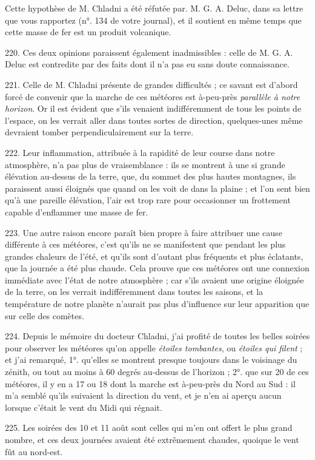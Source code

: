 \documentclass[a4paper, 11pt, oneside, polutonikogreek, french]{article}
\begin{document}
Cette hypothèse de M. Chladni a été réfutée par. M. G. A. Deluc, dans sa lettre que vous rapportez (n°. 134 de votre journal), et il soutient en même temps que cette masse de fer est un produit volcanique.

220. Ces deux opinions paraissent également inadmissibles : celle de M. G. A. Deluc est contredite par des faits dont il n'a pas eu sans doute connaissance.

221. Celle de M. Chladni présente de grandes difficultés ; ce savant est d'abord forcé de convenir que la marche de ces météores est à-peu-près \emph{parallèle à notre horizon}. Or il est évident que s'ils venaient indifféremment de tous les points de l'espace, on les verrait aller dans toutes sortes de direction, quelques-unes même devraient tomber perpendiculairement sur la terre.

222. Leur inflammation, attribuée à la rapidité de leur course dans notre atmosphère, n'a pas plus de vraisemblance : ils se montrent à une si grande élévation au-dessus de la terre, que, du sommet des plus hautes montagnes, ils paraissent aussi éloignés que quand on les voit de dans la plaine ; et l'on sent bien qu'à une pareille élévation, l'air est trop rare pour occasionner un frottement capable d'enflammer une masse de fer.

223. Une autre raison encore paraît bien propre à faire attribuer une cause différente à ces météores, c'est qu'ils ne se manifestent que pendant les plus grandes chaleurs de l'été, et qu'ils sont d'autant plus fréquents et plus éclatants, que la journée a été plus chaude. Cela prouve que ces météores ont une connexion immédiate avec l'état de notre atmosphère ; car s'ils avaient une origine éloignée de la terre, on les verrait indifféremment dans toutes les saisons, et la température de notre planète n'aurait pas plus d'influence sur leur apparition que sur celle des comètes.

224. Depuis le mémoire du docteur Chladni, j'ai profité de toutes les belles soirées pour observer les météores qu'on appelle \emph{étoiles tombantes}, ou \emph{étoiles qui filent} ; et j'ai remarqué, 1°. qu'elles se montrent presque toujours dans le voisinage du zénith, ou tout au moins à 60 degrés au-dessus de l'horizon ; 2°. que sur 20 de ces météores, il y en a 17 ou 18 dont la marche est à-peu-près du Nord au Sud : il m'a semblé qu'ils suivaient la direction du vent, et je n'en ai aperçu aucun lorsque c'était le vent du Midi qui régnait.

225. Les soirées des 10 et 11 août sont celles qui m'en ont offert le plus grand nombre, et ces deux journées avaient été extrêmement chaudes, quoique le vent fût au nord-est.
\end{document}
